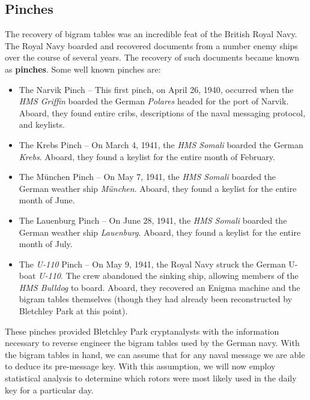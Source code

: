 \subsection{Pinches}
The recovery of bigram tables was an incredible feat of the British
Royal Navy. The Royal Navy boarded and recovered documents from a
number enemy ships over the course of several years. The recovery of
such documents became known as {\bf{pinches}}. Some well known pinches are:
\begin{itemize}
  \item The Narvik Pinch -- This first pinch, on April 26, 1940,
    occurred when the \emph{HMS Griffin} boarded the German
    \emph{Polares} headed for the port of Narvik. Aboard, they found
    entire cribs, descriptions of the naval messaging protocol, and keylists.
  \item The Krebs Pinch -- On March 4, 1941, the \emph{HMS Somali}
    boarded the German \emph{Krebs}. Aboard, they found a keylist for
    the entire month of February.
  \item The München Pinch -- On May 7, 1941, the \emph{HMS Somali}
    boarded the German weather ship \emph{München}. Aboard, they
    found a keylist for the entire month of June.
  \item The Lauenburg Pinch -- On June 28, 1941, the \emph{HMS
    Somali} boarded the German weather ship \emph{Lauenburg}. Aboard,
    they found a keylist for the entire month of July.
  \item The \emph{U-110} Pinch -- On May 9, 1941, the Royal Navy
    struck the German U-boat \emph{U-110}. The crew abandoned the
    sinking ship, allowing members of the \emph{HMS Bulldog} to
    board. Aboard, they recovered an Enigma machine and the bigram
    tables themselves (though they had already been reconstructed by
    Bletchley Park at this point).
\end{itemize}
\noindent These pinches provided Bletchley Park cryptanalysts with
the information necessary to reverse engineer the bigram tables used
by the German navy. With the bigram tables in hand, we can assume that for any
naval message we are able to deduce its pre-message key. With this
assumption, we will now employ statistical analysis to determine
which rotors were most likely used in the daily key for a particular day.

